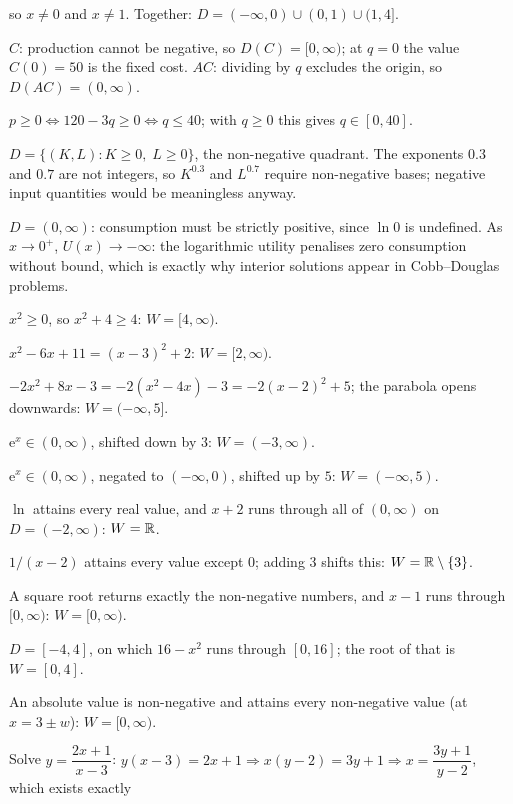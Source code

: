 \begin{solutions}
        so $x\neq0$ and $x\neq1$. Together:
        \;$D=(-\infty,0)\cup(0,1)\cup(1,4]$.
  \item $C$: production cannot be negative, so $D(C)=[0,\infty)$; at $q=0$
        the value $C(0)=50$ is the fixed cost. $AC$: dividing by $q$
        excludes the origin, so $D(AC)=(0,\infty)$.
  \item $p\geq0\iff 120-3q\geq0\iff q\leq40$; with $q\geq0$ this gives
        $q\in[0,40]$.
  \item $D=\{(K,L): K\geq0,\;L\geq0\}$, the non-negative quadrant. The
        exponents $0.3$ and $0.7$ are not integers, so $K^{0.3}$ and
        $L^{0.7}$ require non-negative bases; negative input quantities
        would be meaningless anyway.
  \item $D=(0,\infty)$: consumption must be strictly positive, since
        $\ln 0$ is undefined. As $x\to0^{+}$, $U(x)\to-\infty$: the
        logarithmic utility penalises zero consumption without bound,
        which is exactly why interior solutions appear in Cobb--Douglas
        problems.
  \item $x^{2}\geq0$, so $x^{2}+4\geq4$: \;$W=[4,\infty)$.
  \item $x^{2}-6x+11=(x-3)^{2}+2$: \;$W=[2,\infty)$.
  \item $-2x^{2}+8x-3=-2(x^{2}-4x)-3=-2(x-2)^{2}+5$; the parabola opens
        downwards: \;$W=(-\infty,5]$.
  \item $\mathrm{e}^{x}\in(0,\infty)$, shifted down by $3$:
        \;$W=(-3,\infty)$.
  \item $\mathrm{e}^{x}\in(0,\infty)$, negated to $(-\infty,0)$, shifted up
        by $5$: \;$W=(-\infty,5)$.
  \item $\ln$ attains every real value, and $x+2$ runs through all of
        $(0,\infty)$ on $D=(-2,\infty)$: \;$W=\mathbb{R}$.
  \item $1/(x-2)$ attains every value except $0$; adding $3$ shifts this:
        \;$W=\mathbb{R}\setminus\{3\}$.
  \item A square root returns exactly the non-negative numbers, and
        $x-1$ runs through $[0,\infty)$: \;$W=[0,\infty)$.
  \item $D=[-4,4]$, on which $16-x^{2}$ runs through $[0,16]$; the root of
        that is \;$W=[0,4]$.
  \item An absolute value is non-negative and attains every non-negative
        value (at $x=3\pm w$): \;$W=[0,\infty)$.
  \item Solve $y=\dfrac{2x+1}{x-3}$: \;$y(x-3)=2x+1\Rightarrow
        x(y-2)=3y+1\Rightarrow x=\dfrac{3y+1}{y-2}$, which exists exactly

\end{solutions}
